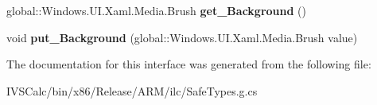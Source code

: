 \begin{DoxyCompactItemize}
\item 
\mbox{\label{interface_windows_1_1_u_i_1_1_xaml_1_1_controls_1_1_i_panel_a5fbb285baf86c6114b6c3c7aa1f0395f}} 
global\+::\+Windows.\+U\+I.\+Xaml.\+Media.\+Brush {\bfseries get\+\_\+\+Background} ()
\item 
\mbox{\label{interface_windows_1_1_u_i_1_1_xaml_1_1_controls_1_1_i_panel_afeaa387907f957a8e159050c2a81c6f1}} 
void {\bfseries put\+\_\+\+Background} (global\+::\+Windows.\+U\+I.\+Xaml.\+Media.\+Brush value)
\end{DoxyCompactItemize}


The documentation for this interface was generated from the following file\+:\begin{DoxyCompactItemize}
\item 
I\+V\+S\+Calc/bin/x86/\+Release/\+A\+R\+M/ilc/Safe\+Types.\+g.\+cs\end{DoxyCompactItemize}
